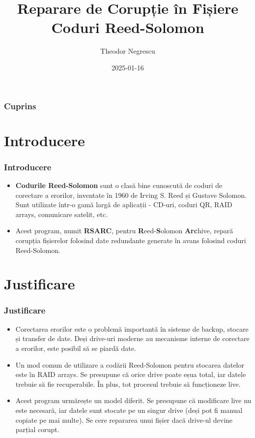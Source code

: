 \documentclass{beamer}
\title{Reparare de Corupție în Fișiere \\ \large Coduri Reed-Solomon}
\author{Theodor Negrescu}
\date{2025-01-16}
\begin{document}
\frame{\titlepage}

\begin{frame}
\frametitle {Cuprins}
\tableofcontents
\end{frame}

\section{Introducere}
\begin{frame}
\frametitle{Introducere}
\begin{itemize}
\item 
\textbf{Codurile Reed-Solomon} sunt o clasă bine cunoscută de coduri de corectare a erorilor, inventate în 1960 de Irving S. Reed și Gustave Solomon.
Sunt utilizate într-o gamă largă de aplicații - CD-uri, coduri QR, RAID arrays, comunicare satelit, etc.

\item
Acest program, numit \textbf{RSARC}, pentru \textbf{R}eed-\textbf{S}olomon \textbf{Arc}hive,
repară corupția fișierelor folosind date redundante generate în avans folosind coduri Reed-Solomon.
\end{itemize}
\end{frame}

\section{Justificare}
\begin{frame}
\frametitle{Justificare}
\begin{itemize}
\item
Corectarea erorilor este o problemă importantă în sisteme de backup, stocare și transfer de date.
Deși drive-uri moderne au mecanisme interne de corectare a erorilor, este posibil să se piardă date.

\item
Un mod comun de utilizare a codării Reed-Solomon pentru stocarea datelor este în RAID arrays.
Se presupune că orice drive poate eșua total, iar datele trebuie să fie recuperabile.
În plus, tot procesul trebuie să funcționeze live.

\item
Acest program urmărește un model diferit.
Se presupune că modificare live nu este necesară, iar datele sunt stocate pe un singur drive (deși pot fi manual copiate pe mai multe).
Se cere repararea unui fișier dacă drive-ul devine parțial corupt.
\end{itemize}
\end{frame}
\end{document}
